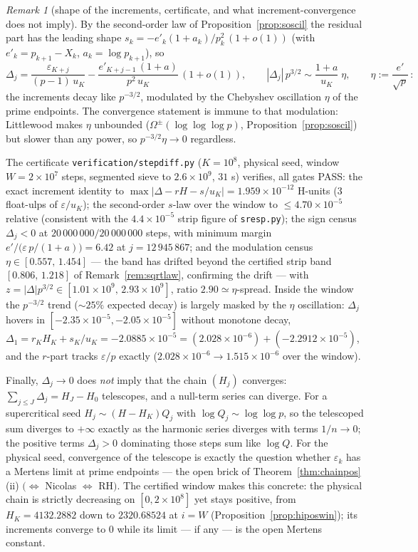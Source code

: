 \documentclass[11pt]{article}
\theoremstyle{remark}
\newtheorem{remark}[theorem]{Remark}
\newcommand{\eps}{\varepsilon}
\begin{document}
\begin{remark}[shape of the increments, certificate, and what
increment-convergence does not imply]\label{rem:stepdiffnum}
By the second-order law of Proposition~\ref{prop:soscil} the residual
part has the leading shape $s_{k}=-e'_k(1+a_k)/p_k^{2}\,(1+o(1))$
(with $e'_k=p_{k+1}-X_k$, $a_k=\log p_{k+1}$), so
\[
\Delta_j=\frac{\eps_{K+j}}{(p-1)\,u_K}
-\frac{e'_{K+j-1}\,(1+a)}{p^{2}\,u_K}\,(1+o(1)),
\qquad
|\Delta_j|\,p^{3/2}\sim\frac{1+a}{u_K}\;\eta,
\qquad \eta:=\frac{e'}{\sqrt p}\,:
\]
the increments decay like $p^{-3/2}$, modulated by the Chebyshev
oscillation $\eta$ of the prime endpoints. The convergence statement is
immune to that modulation: Littlewood makes $\eta$ unbounded
($\Omega^{\pm}(\log\log\log p)$, Proposition~\ref{prop:soscil}) but
slower than any power, so $p^{-3/2}\eta\to0$ regardless.

The certificate \texttt{verification/stepdiff.py} ($K=10^8$, physical
seed, window $W=2\times10^7$ steps, segmented sieve to
$2.6\times10^9$, $31$ s) verifies, all gates {\sc PASS}: the exact
increment identity to $\max|\Delta-rH-s/u_K|=1.959\times10^{-12}$
H-units ($3$ float-ulps of $\eps/u_K$); the second-order $s$-law over
the window to $\le4.70\times10^{-5}$ relative (consistent with the
$4.4\times10^{-5}$ strip figure of \texttt{sresp.py}); the sign census
$\Delta_j<0$ at $20\,000\,000/20\,000\,000$ steps, with minimum margin
$e'/\bigl(\eps\,p/(1+a)\bigr)=6.42$ at $j=12\,945\,867$; and the modulation
census $\eta\in[0.557,\,1.454]$ --- the band has drifted beyond the
certified strip band $[0.806,\,1.218]$ of Remark~\ref{rem:sqrtlaw},
confirming the drift --- with $z=|\Delta|p^{3/2}\in[1.01\times10^{9},\,
2.93\times10^{9}]$, ratio $2.90\simeq\eta$-spread. Inside the window
the $p^{-3/2}$ trend ($\sim25\%$ expected decay) is largely masked by
the $\eta$ oscillation: $\Delta_j$ hovers in
$[-2.35\times10^{-5},-2.05\times10^{-5}]$ without monotone decay,
$\Delta_1=r_KH_K+s_K/u_K=-2.0885\times10^{-5}
=(2.028\times10^{-6})+(-2.2912\times10^{-5})$, and the $r$-part tracks
$\eps/p$ exactly ($2.028\times10^{-6}\to1.515\times10^{-6}$ over the
window).

Finally, $\Delta_j\to0$ does \emph{not} imply that the chain
$(H_j)$ converges: $\sum_{j\le J}\Delta_j=H_J-H_0$ telescopes, and a
null-term series can diverge. For a supercritical seed
$H_j\sim(H-H_K)Q_j$ with $\log Q_j\sim\log\log p$, so the telescoped sum diverges to
$+\infty$ exactly as the harmonic series diverges with
terms $1/n\to0$; the positive terms $\Delta_j>0$ dominating those
steps sum like $\log Q$. For the physical seed, convergence of the
telescope is exactly the question whether $\eps_k$ has a Mertens limit
at prime endpoints --- the open brick of
Theorem~\ref{thm:chainpos}\,(ii) $\bigl(\iff$ Nicolas $\iff$
RH$\bigr)$. The certified window makes this concrete: the physical
chain is strictly decreasing on $[0,2\times10^8]$ yet stays positive,
from $H_K=4132.2882$ down to $2320.68524$ at $i=W$
(Proposition~\ref{prop:hiposwin}); its increments converge to $0$
while its limit --- if any --- is the open Mertens constant.
\end{remark}
\end{document}
